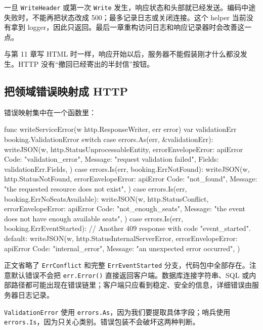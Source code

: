 一旦 \texttt{WriteHeader} 或第一次 \texttt{Write} 发生，响应状态和头部就已经发送。编码中途失败时，不能再把状态改成 500；最多记录日志或关闭连接。这个 helper 当前没有拿到 logger，因此只返回。最后一章重构访问日志和响应记录器时会改善这一点。

与第 11 章写 HTML 时一样，响应开始以后，服务器不能假装刚才什么都没发生。HTTP 没有“撤回已经寄出的半封信”按钮。

\subsection{把领域错误映射成 HTTP}

错误映射集中在一个函数里：

\begin{gocode}[title={代码清单 12.28 \texttt{json.go}：错误分类与状态码}]
func writeServiceError(w http.ResponseWriter, err error) {
    var validationErr booking.ValidationError
    switch {
    case errors.As(err, &validationErr):
        writeJSON(w, http.StatusUnprocessableEntity,
            errorEnvelope{Error: apiError{
                Code: "validation_error",
                Message: "request validation failed",
                Fields: validationErr.Fields,
            }})
    case errors.Is(err, booking.ErrNotFound):
        writeJSON(w, http.StatusNotFound,
            errorEnvelope{Error: apiError{
                Code: "not_found",
                Message: "the requested resource does not exist",
            }})
    case errors.Is(err, booking.ErrNoSeatsAvailable):
        writeJSON(w, http.StatusConflict,
            errorEnvelope{Error: apiError{
                Code: "not_enough_seats",
                Message: "the event does not have enough available seats",
            }})
    case errors.Is(err, booking.ErrEventStarted):
        // Another 409 response with code "event_started".
    default:
        writeJSON(w, http.StatusInternalServerError,
            errorEnvelope{Error: apiError{
                Code: "internal_error",
                Message: "an unexpected error occurred",
            }})
    }
}
\end{gocode}

正文省略了 \texttt{ErrConflict} 和完整 \texttt{ErrEventStarted} 分支，代码包中全部存在。注意默认错误不会把 \texttt{err.Error()} 直接返回客户端。数据库连接字符串、SQL 或内部路径都可能出现在错误链里；客户端只应看到稳定、安全的信息，详细错误由服务器日志记录。

\texttt{ValidationError} 使用 \texttt{errors.As}，因为我们要提取具体字段；哨兵使用 \texttt{errors.Is}，因为只关心类别。错误包装不会破坏这两种判断。

